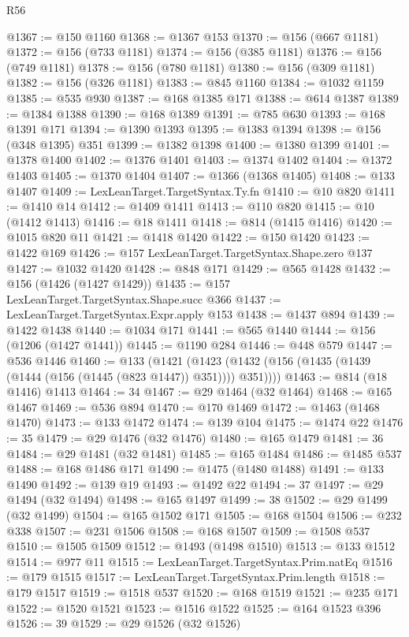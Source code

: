 \begin{lexlean}{R56}
\begin{coremodule}
@1367 := @150 @1160
@1368 := @1367 @153
@1370 := @156 (@667 @1181)
@1372 := @156 (@733 @1181)
@1374 := @156 (@385 @1181)
@1376 := @156 (@749 @1181)
@1378 := @156 (@780 @1181)
@1380 := @156 (@309 @1181)
@1382 := @156 (@326 @1181)
@1383 := @845 @1160
@1384 := @1032 @1159
@1385 := @535 @930
@1387 := @168 @1385 @171
@1388 := @614 @1387
@1389 := @1384 @1388
@1390 := @168 @1389
@1391 := @785 @630
@1393 := @168 @1391 @171
@1394 := @1390 @1393
@1395 := @1383 @1394
@1398 := @156 (@348 @1395) @351
@1399 := @1382 @1398
@1400 := @1380 @1399
@1401 := @1378 @1400
@1402 := @1376 @1401
@1403 := @1374 @1402
@1404 := @1372 @1403
@1405 := @1370 @1404
@1407 := @1366 (@1368 @1405)
@1408 := @133 @1407
@1409 := LexLeanTarget.TargetSyntax.Ty.fn
@1410 := @10 @820
@1411 := @1410 @14
@1412 := @1409 @1411
@1413 := @110 @820
@1415 := @10 (@1412 @1413)
@1416 := @18 @1411
@1418 := @814 (@1415 @1416)
@1420 := @1015 @820 @11
@1421 := @1418 @1420
@1422 := @150 @1420
@1423 := @1422 @169
@1426 := @157 LexLeanTarget.TargetSyntax.Shape.zero @137
@1427 := @1032 @1420
@1428 := @848 @171
@1429 := @565 @1428
@1432 := @156 (@1426 (@1427 @1429))
@1435 := @157 LexLeanTarget.TargetSyntax.Shape.succ @366
@1437 := LexLeanTarget.TargetSyntax.Expr.apply @153
@1438 := @1437 @894
@1439 := @1422 @1438
@1440 := @1034 @171
@1441 := @565 @1440
@1444 := @156 (@1206 (@1427 @1441))
@1445 := @1190 @284
@1446 := @448 @579
@1447 := @536 @1446
@1460 := @133
    (@1421 (@1423 (@1432 (@156 (@1435 (@1439 (@1444 (@156 (@1445 (@823 @1447)) @351)))) @351))))
@1463 := @814 (@18 @1416) @1413
@1464 := 34
@1467 := @29 @1464 (@32 @1464)
@1468 := @165 @1467
@1469 := @536 @894
@1470 := @170 @1469
@1472 := @1463 (@1468 @1470)
@1473 := @133 @1472
@1474 := @139 @104
@1475 := @1474 @22
@1476 := 35
@1479 := @29 @1476 (@32 @1476)
@1480 := @165 @1479
@1481 := 36
@1484 := @29 @1481 (@32 @1481)
@1485 := @165 @1484
@1486 := @1485 @537
@1488 := @168 @1486 @171
@1490 := @1475 (@1480 @1488)
@1491 := @133 @1490
@1492 := @139 @19
@1493 := @1492 @22
@1494 := 37
@1497 := @29 @1494 (@32 @1494)
@1498 := @165 @1497
@1499 := 38
@1502 := @29 @1499 (@32 @1499)
@1504 := @165 @1502 @171
@1505 := @168 @1504
@1506 := @232 @338
@1507 := @231 @1506
@1508 := @168 @1507
@1509 := @1508 @537
@1510 := @1505 @1509
@1512 := @1493 (@1498 @1510)
@1513 := @133 @1512
@1514 := @977 @11
@1515 := LexLeanTarget.TargetSyntax.Prim.natEq
@1516 := @179 @1515
@1517 := LexLeanTarget.TargetSyntax.Prim.length
@1518 := @179 @1517
@1519 := @1518 @537
@1520 := @168 @1519
@1521 := @235 @171
@1522 := @1520 @1521
@1523 := @1516 @1522
@1525 := @164 @1523 @396
@1526 := 39
@1529 := @29 @1526 (@32 @1526)

\end{coremodule}
\end{lexlean}
